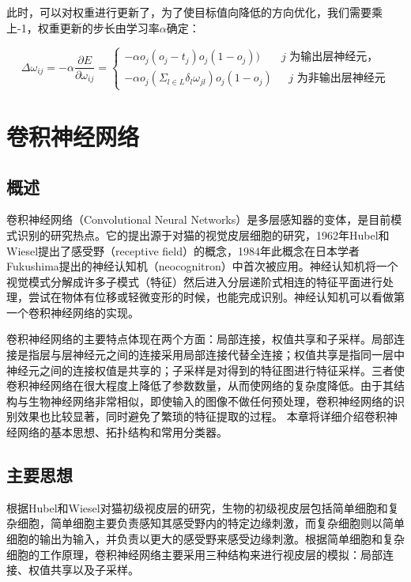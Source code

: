 \documentclass[bachelor,zhspacing]{cqu}  %
\begin{document}
此时，可以对权重进行更新了，为了使目标值向降低的方向优化，我们需要乘上-1，权重更新的步长由学习率\(\alpha\)确定：

\begin{equation}
\Delta\omega_{ij} = -\alpha\frac{\partial E}{\partial \omega_{ij}}= \left\{ \begin{array}{ll}
 -\alpha o_{j}(o_{j}-t_{j})o_{j}(1-o_{j})) & \textrm{$j$ 为输出层神经元，}\\
 -\alpha o_{j}(\Sigma_{l\in L}\delta_{l}\omega_{jl})o_{j}(1-o_{j}) & \textrm{ $j$ 为非输出层神经元}
  \end{array} \right.
\label{eq:bp-d-delta-weight}\end{equation}

\section{卷积神经网络}\label{ux5377ux79efux795eux7ecfux7f51ux7edc}

\subsection{概述}\label{ux6982ux8ff0}

卷积神经网络（Convolutional Neural
Networks）是多层感知器的变体，是目前模式识别的研究热点。它的提出源于对猫的视觉皮层细胞的研究，1962年Hubel和Wiesel提出了感受野（receptive
field）的概念，1984年此概念在日本学者Fukushima提出的神经认知机（neocognitron）中首次被应用。神经认知机将一个视觉模式分解成许多子模式（特征）然后进入分层递阶式相连的特征平面进行处理，尝试在物体有位移或轻微变形的时候，也能完成识别。神经认知机可以看做第一个卷积神经网络的实现。

卷积神经网络的主要特点体现在两个方面：局部连接，权值共享和子采样。局部连接是指层与层神经元之间的连接采用局部连接代替全连接；权值共享是指同一层中神经元之间的连接权值是共享的；子采样是对得到的特征图进行特征采样。三者使卷积神经网络在很大程度上降低了参数数量，从而使网络的复杂度降低。由于其结构与生物神经网络非常相似，即使输入的图像不做任何预处理，卷积神经网络的识别效果也比较显著，同时避免了繁琐的特征提取的过程。
本章将详细介绍卷积神经网络的基本思想、拓扑结构和常用分类器。

\subsection{主要思想}\label{ux4e3bux8981ux601dux60f3}

根据Hubel和Wiesel对猫初级视皮层的研究，生物的初级视皮层包括简单细胞和复杂细胞，简单细胞主要负责感知其感受野内的特定边缘刺激，而复杂细胞则以简单细胞的输出为输入，并负责以更大的感受野来感受边缘刺激。根据简单细胞和复杂细胞的工作原理，卷积神经网络主要采用三种结构来进行视皮层的模拟：局部连接、权值共享以及子采样。
\end{document}
